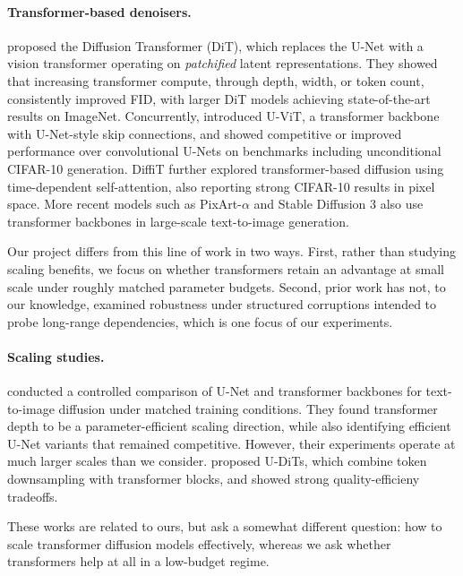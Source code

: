 \documentclass{article}
\begin{document}
\paragraph{Transformer-based denoisers.}
\citet{peebles2023dit} proposed the Diffusion Transformer (DiT), which replaces the U-Net with a vision transformer operating on \emph{patchified} latent representations. 
They showed that increasing transformer compute, through depth, width, or token count, consistently improved FID, with larger DiT models achieving state-of-the-art results on ImageNet.
Concurrently, \citep{bao2023uvit} introduced U-ViT, a transformer backbone with U-Net-style skip connections, and showed competitive or improved performance over convolutional U-Nets on benchmarks including unconditional CIFAR-10 generation.
DiffiT \citep{hatamizadeh2024diffit} further explored transformer-based diffusion using time-dependent self-attention, also reporting strong CIFAR-10 results in pixel space.
More recent models such as PixArt-$\alpha$ \citep{chen2024pixart} and Stable Diffusion 3 \citep{esser2024sd3} also use transformer backbones in large-scale text-to-image generation.

Our project differs from this line of work in two ways. First, rather than studying scaling benefits, we focus on whether transformers retain an advantage at small scale under roughly matched parameter budgets.
Second, prior work has not, to our knowledge, examined robustness under structured corruptions intended to probe long-range dependencies, which is one focus of our experiments.

\paragraph{Scaling studies.}
\citet{li2024scalability} conducted a controlled comparison of U-Net and transformer backbones for text-to-image diffusion under matched training conditions. 
They found transformer depth to be a parameter-efficient scaling direction, while also identifying efficient U-Net variants that remained competitive.
However, their experiments operate at much larger scales than we consider.
\citet{tian2024udit} proposed U-DiTs, which combine token downsampling with transformer blocks, and showed strong quality-efficieny tradeoffs.

These works are related to ours, but ask a somewhat different question: how to scale transformer diffusion models effectively, whereas we ask whether transformers help at all in a low-budget regime.
\end{document}
